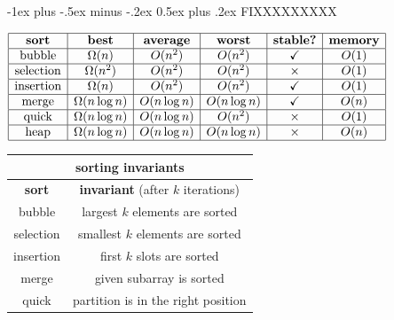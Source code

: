 \documentclass[10pt]{article}
\makeatletter
\newenvironment{tightcenter}{%
  \setlength\topsep{0pt}
  \setlength\parskip{0pt}
  \begin{center}
}{%
  \end{center}
}
\renewcommand{\section}{\@startsection{section}{1}{0mm}%
                                {-1ex plus -.5ex minus -.2ex}%
                                {0.5ex plus .2ex}%
                                {\normalfont\large\bfseries}}
\makeatother
\begin{document}
\section{FIXXXXXXXXX}
\begin{minipage}{0.5\linewidth}   
    \begin{tightcenter}
        $\begin{array}{| c | c | c | c | c | c |}
            \hline\textbf{sort} & \textbf{best} & \textbf{average} & \textbf{worst} & \textbf{stable?} & \textbf{memory}
    
            \\\hline\text{bubble} & \Omega(n) & O(n^2) & O(n^2) & \checkmark & O(1)
            
            \\\hline\text{selection} & \Omega(n^2) & O(n^2) & O(n^2) & \times & O(1)
            
            \\\hline\text{insertion} & \Omega(n) & O(n^2) & O(n^2) & \checkmark & O(1)
            
            \\\hline\text{merge} & \Omega(n\log n) & O(n\log n) & O(n\log n) & \checkmark & O(n)
            
            \\\hline\text{quick} & \Omega(n\log n) & O(n\log n) & O(n^2) & \times & O(1)

            \\\hline\text{heap} & \Omega(n\log n) & O(n\log n) & O(n\log n) & \times & O(n)
            \\\hline
        \end{array} 
        $\
        \begin{tabular}{| c | c |}
            \multicolumn{2}{c}{sorting invariants}
            \\\hline\textbf{sort} & \textbf{invariant} (after $k$ iterations)
            \\\hline bubble & largest $k$ elements are sorted
            \\\hline selection & smallest $k$ elements are sorted
            \\\hline insertion & first $k$ slots are sorted
            \\\hline merge & given subarray is sorted
            \\\hline quick & partition is in the right position
            \\\hline
        \end{tabular} 
    \end{tightcenter}
    
\end{minipage}
\end{document}
